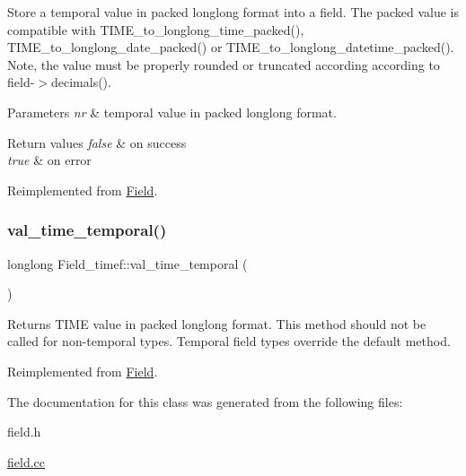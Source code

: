 Store a temporal value in packed longlong format into a field. The packed value is compatible with T\+I\+M\+E\+\_\+to\+\_\+longlong\+\_\+time\+\_\+packed(), T\+I\+M\+E\+\_\+to\+\_\+longlong\+\_\+date\+\_\+packed() or T\+I\+M\+E\+\_\+to\+\_\+longlong\+\_\+datetime\+\_\+packed(). Note, the value must be properly rounded or truncated according according to field-\/$>$decimals().


\begin{DoxyParams}{Parameters}
{\em nr} & temporal value in packed longlong format. \\
\hline
\end{DoxyParams}

\begin{DoxyRetVals}{Return values}
{\em false} & on success \\
\hline
{\em true} & on error \\
\hline
\end{DoxyRetVals}


Reimplemented from \mbox{\hyperlink{classField_a5c09752e8441d64ce2e4e611508bab7a}{Field}}.

\mbox{\label{classField__timef_a03db4df3722b7e0292b84b982de342e3}} 
\subsubsection{\texorpdfstring{val\+\_\+time\+\_\+temporal()}{val\_time\_temporal()}}
{\footnotesize\ttfamily longlong Field\+\_\+timef\+::val\+\_\+time\+\_\+temporal (\begin{DoxyParamCaption}{ }\end{DoxyParamCaption})\hspace{0.3cm}{\ttfamily [virtual]}}

Returns T\+I\+ME value in packed longlong format. This method should not be called for non-\/temporal types. Temporal field types override the default method. 

Reimplemented from \mbox{\hyperlink{classField_a504ae8be08face4684852eaa79734158}{Field}}.



The documentation for this class was generated from the following files\+:\begin{DoxyCompactItemize}
\item 
field.\+h\item 
\mbox{\hyperlink{field_8cc}{field.\+cc}}\end{DoxyCompactItemize}

